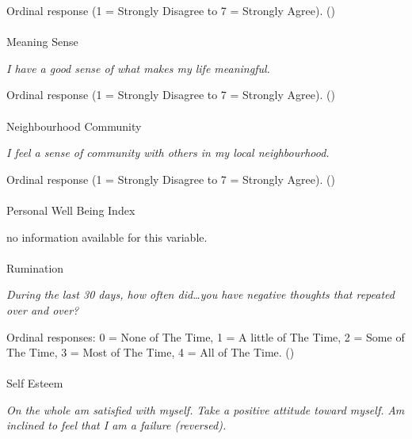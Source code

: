 \documentclass[
  single column]{article}
\makeatletter
\let\oldparagraph\paragraph
\renewcommand{\paragraph}{
    \@ifstar
      \xxxParagraphStar
      \xxxParagraphNoStar
  }
\newcommand{\xxxParagraphStar}[1]{\oldparagraph*{#1}\mbox{}}
\newcommand{\xxxParagraphNoStar}[1]{\oldparagraph{#1}\mbox{}}
\makeatother
\begin{document}
Ordinal response (1 = Strongly Disagree to 7 = Strongly Agree).
()

\paragraph{Meaning Sense}\label{meaning-sense}

\emph{I have a good sense of what makes my life meaningful.}

Ordinal response (1 = Strongly Disagree to 7 = Strongly Agree).
()

\paragraph{Neighbourhood Community}\label{neighbourhood-community}

\emph{I feel a sense of community with others in my local
neighbourhood.}

Ordinal response (1 = Strongly Disagree to 7 = Strongly Agree).
()

\paragraph{Personal Well Being Index}\label{personal-well-being-index}

no information available for this variable.

\paragraph{Rumination}\label{rumination}

\emph{During the last 30 days, how often did\ldots you have negative
thoughts that repeated over and over?}

Ordinal responses: 0 = None of The Time, 1 = A little of The Time, 2 =
Some of The Time, 3 = Most of The Time, 4 = All of The Time.
()

\paragraph{Self Esteem}\label{self-esteem}

\emph{On the whole am satisfied with myself.} \emph{Take a positive
attitude toward myself.} \emph{Am inclined to feel that I am a failure
(reversed).}
\end{document}
